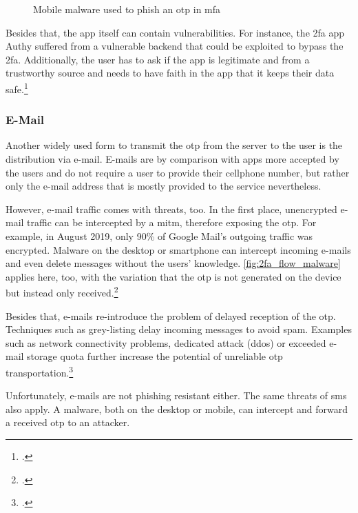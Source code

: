  \newpage
 
 \begin{figure}[hbt]
	\centering
	
	\caption[Mobile malware used to phish an \gls{otp} in \gls{mfa}]{Mobile malware used to phish an \gls{otp} in \gls{mfa}\footnotemark}
	\label{fig:2fa_flow_malware}
\end{figure}
 
 Besides that, the app itself can contain vulnerabilities. For instance, the \gls{2fa} app Authy suffered from a vulnerable backend that could be exploited to bypass the \gls{2fa}. Additionally, the user has to ask if the app is legitimate and from a trustworthy source and needs to have faith in the app that it keeps their data safe.\footcites[See][]{eset-bypass2fa}[See][]{sakurity-authy}
 
\subsubsection{E-Mail}

Another widely used form to transmit the \gls{otp} from the server to the user is the distribution via e-mail. E-mails are by comparison with apps more accepted by the users and do not require a user to provide their cellphone number, but rather only the e-mail address that is mostly provided to the service nevertheless.

However, e-mail traffic comes with threats, too. In the first place, unencrypted e-mail traffic can be intercepted by a \gls{mitm}, therefore exposing the \gls{otp}. For example, in August 2019, only 90\% of Google Mail's outgoing traffic was encrypted. Malware on the desktop or smartphone can intercept incoming e-mails and even delete messages without the users' knowledge. \autoref{fig:2fa_flow_malware} applies here, too, with the variation that the \gls{otp} is not generated on the device but instead only received.\footcites[See][]{email-encryption}

Besides that, e-mails re-introduce the problem of delayed reception of the \gls{otp}. Techniques such as grey-listing delay incoming messages to avoid spam. Examples such as network connectivity problems, dedicated attack (\gls{ddos}) or exceeded e-mail storage quota further increase the potential of unreliable \gls{otp} transportation.\footcites[See][]{rfc6647}

Unfortunately, e-mails are not phishing resistant either. The same threats of \gls{sms} also apply. A malware, both on the desktop or mobile, can intercept and forward a received \gls{otp} to an attacker.
